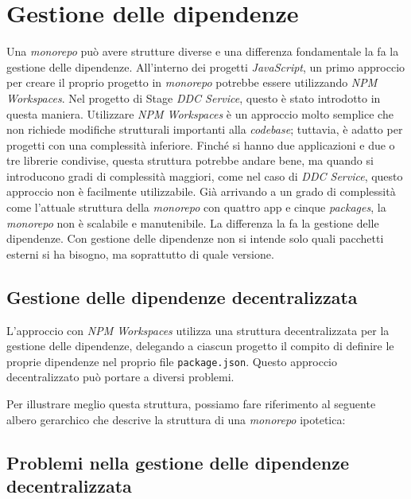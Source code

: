 \pagebreak

\section{Gestione delle dipendenze}
Una \textit{monorepo} può avere strutture diverse e una differenza fondamentale la fa la gestione delle dipendenze. 
All'interno dei progetti \textit{JavaScript}, un primo approccio per creare il proprio progetto in \textit{monorepo} potrebbe essere utilizzando \textit{NPM Workspaces}.
Nel progetto di Stage \textit{DDC Service}, questo è stato introdotto in questa maniera.
Utilizzare \textit{NPM Workspaces} è un approccio molto semplice che non richiede modifiche strutturali importanti alla \textit{codebase}; tuttavia, è adatto per progetti con una complessità inferiore.
Finché si hanno due applicazioni e due o tre librerie condivise, questa struttura potrebbe andare bene, ma quando si introducono gradi di complessità maggiori, come nel caso di \textit{DDC Service}, questo approccio non è facilmente utilizzabile.
Già arrivando a un grado di complessità come l'attuale struttura della \textit{monorepo} con quattro app e cinque \textit{packages}, la \textit{monorepo} non è scalabile e manutenibile.
La differenza la fa la gestione delle dipendenze.
Con gestione delle dipendenze non si intende solo quali pacchetti esterni si ha bisogno, ma soprattutto di quale versione.

\pagebreak
\subsection{Gestione delle dipendenze decentralizzata}
L'approccio con \textit{NPM Workspaces} utilizza una struttura decentralizzata per la gestione delle dipendenze, delegando a ciascun progetto il compito di definire le proprie dipendenze nel proprio file \texttt{package.json}.
Questo approccio decentralizzato può portare a diversi problemi.

Per illustrare meglio questa struttura, possiamo fare riferimento al seguente albero gerarchico che descrive la struttura di una \textit{monorepo} ipotetica:



\subsection{Problemi nella gestione delle dipendenze decentralizzata}

